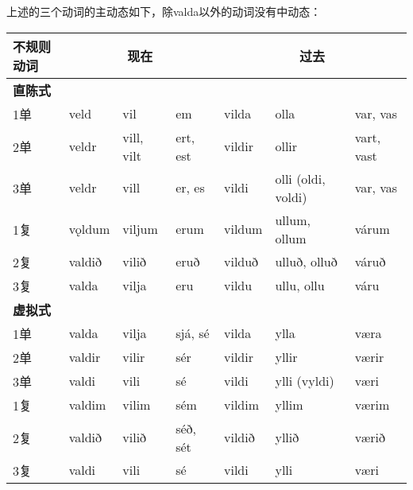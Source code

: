 上述的三个动词的主动态如下，除valda以外的动词没有中动态：

\begin{longtable}{llll|lll}
    \toprule
    不规则动词 & \multicolumn{3}{c}{现在} & \multicolumn{3}{c}{过去} \\
    \midrule
    \endhead
    \bottomrule
    \endfoot
    \textbf{直陈式}   &          &            & \multicolumn{1}{r}{ } &        &                    &                          \\
    1单               & veld     & vil        & em                    & vilda  & olla               & var, vas                 \\
    2单               & veldr    & vill, vilt & ert, est              & vildir & ollir              & vart, vast               \\
    3单               & veldr    & vill       & er, es                & vildi  & olli (oldi, voldi) & var, vas                 \\
    1复               & vǫldum   & viljum     & erum                  & vildum & ullum, ollum       & várum                    \\
    2复               & valdið   & vilið      & eruð                  & vilduð & ulluð, olluð       & váruð                    \\
    3复               & valda    & vilja      & eru                   & vildu  & ullu, ollu         & váru                     \\
    \textbf{虚拟式}   &          &            & \multicolumn{1}{r}{ } &        &                    &                          \\
    1单               & valda    & vilja      & sjá, sé               & vilda  & ylla               & væra                     \\
    2单               & valdir   & vilir      & sér                   & vildir & yllir              & værir                    \\
    3单               & valdi    & vili       & sé                    & vildi  & ylli (vyldi)       & væri                     \\
    1复               & valdim   & vilim      & sém                   & vildim & yllim              & værim                    \\
    2复               & valdið   & vilið      & séð, sét              & vildið & yllið              & værið                    \\
    3复               & valdi    & vili       & sé                    & vildi  & ylli               & væri                     \\

\end{longtable}
